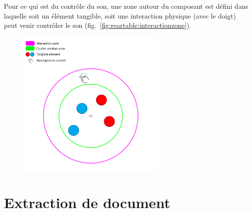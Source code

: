 Pour ce qui est du contrôle du son, une zone autour du composant est défini dans laquelle soit un élément tangible, soit une interaction physique (avec le doigt) peut venir contrôler le son (fig.~\ref{fig:reartable:interactionzone}).

\begin{figure}[H]
\centering
\includegraphics[width=0.65\textwidth]{images/reartable_cluster_interaction}
\end{figure}


\section{Extraction de document}

